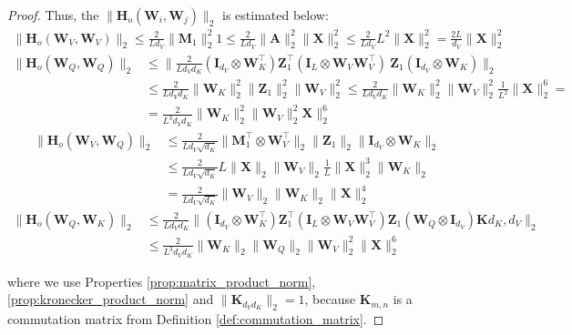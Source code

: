 \documentclass{article}
\begin{document}
\begin{proof}
Thus, the $\|\mathbf{H}_o (\mathbf{W}_i, \mathbf{W}_j) \|_2$ is estimated below:
\begin{align*}
    \| \mathbf{H}_o(\mathbf{W}_V, \mathbf{W}_V)\|_2 \leq \frac{2}{L d_V} \| \mathbf{M}_1\|^2_2 1 \leq \frac{2}{L d_V}\| \mathbf{A}\|^2_2 \| \mathbf{X}\|^2_2 \leq \frac{2}{L d_V} L^2 \| \mathbf{X}\|^2_2 = \frac{2L}{d_V}\| \mathbf{X}\|^2_2
\end{align*}
\begin{align*}
    \| \mathbf{H}_o(\mathbf{W}_Q, \mathbf{W}_Q)\|_2 &\leq \| \frac{2}{L d_V d_K} (\mathbf{I}_{d_V} \otimes \mathbf{W}^\top_K) \mathbf{Z}^\top_1 (\mathbf{I}_{L} \otimes \mathbf{W}_V\mathbf{W}^\top_V)\ \mathbf{Z}_1 (\mathbf{I}_{d_V} \otimes \mathbf{W}_K)\|_2 \\
    &\leq \frac{2}{L d_V d_K} \| \mathbf{W}_K\|_2^2 \|\mathbf{Z}_1 \|^2_2 \| \mathbf{W}_V\|^2_2 \leq \frac{2}{L d_V d_K}\| \mathbf{W}_K\|_2^2\| \mathbf{W}_V\|^2_2 \frac{1}{L^2} \| \mathbf{X}\|^6_2 =\\
    &= \frac{2}{L^3 d_V d_K} \| \mathbf{W}_K\|_2^2\| \mathbf{W}_V\|^2_2 \mathbf{X}\|^6_2
\end{align*}
\begin{align*}
    \| \mathbf{H}_o(\mathbf{W}_V, \mathbf{W}_Q)\|_2 &\leq \frac{2}{L d_V \sqrt{d_K}} \|\mathbf{M}_1^\top \otimes \mathbf{W}_V^\top \|_2 \| \mathbf{Z}_1\|_2 \| \mathbf{I}_{d_V} \otimes \mathbf{W}_K \|_2 \\
    &\leq \frac{2}{L d_V \sqrt{d_K}} L \| \mathbf{X}\|_2 \| \mathbf{W}_V\|_2 \frac{1}{L} \| \mathbf{X}\|^3_2 \| \mathbf{W}_K \|_2 \\
    &= \frac{2}{L d_V \sqrt{d_K}} \| \mathbf{W}_V\|_2 \| \mathbf{W}_K \|_2 \| \mathbf{X}\|^4_2
\end{align*}
\begin{align*}
    \| \mathbf{H}_o(\mathbf{W}_Q, \mathbf{W}_K)\|_2 &\leq \frac{2}{L d_V d_K} \|(\mathbf{I}_{d_V} \otimes \mathbf{W}^\top_K) \mathbf{Z}_1^\top (\mathbf{I}_L \otimes \mathbf{W}_V \mathbf{W}^\top_V) \mathbf{Z}_1 (\mathbf{W}_Q \otimes \mathbf{I}_{d_V}) \mathbf{K}{d_K, d_V}\|_2 \\
    &\leq \frac{2}{L^3 d_V d_K} \|\mathbf{W}_K\|_2 \|\mathbf{W}_Q\|_2 \| \mathbf{W}_V\|_2^2 \|\mathbf{X} \|^6_2
\end{align*}

where we use Properties \ref{prop:matrix_product_norm}, \ref{prop:kronecker_product_norm} and $\| \mathbf{K}_{d_V d_K} \|_2 = 1$, because $\mathbf{K}_{m,n}$ is a commutation matrix from Definition \ref{def:commutation_matrix}. 


\end{proof}
\end{document}
